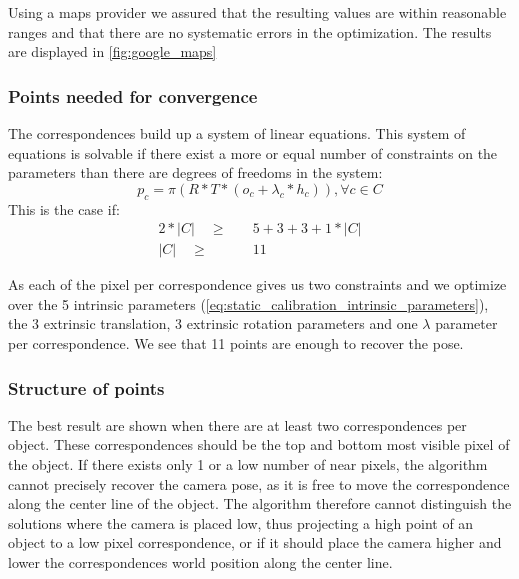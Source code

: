 Using a maps provider we assured that the resulting values are within reasonable ranges and that there are no systematic errors in the optimization.
The results are displayed in \autoref{fig:google_maps}

\subsubsection{Points needed for convergence}
The correspondences build up a system of linear equations. 
This system of equations is solvable if there exist a more or equal number of constraints on the parameters than there are degrees of freedoms in the system:
\begin{equation}
  \label{eq:static_calibration_reprojection_evaluation}
  p_c = \pi \left(  
    R * T *
    (o_c + \lambda_c * h_c)
  \right), \forall c \in C
\end{equation}
This is the case if:
\begin{equation}
  \begin{split}
  2 * \left\lvert C \right\rvert \quad \geq& \quad 5 + 3 + 3 + 1 * \left\lvert C \right\rvert \\
  \left\lvert C \right\rvert \quad \geq& \quad 11 
\end{split}
\end{equation} 

As each of the pixel per correspondence gives us two constraints and we optimize over the 5 intrinsic parameters (\autoref{eq:static_calibration_intrinsic_parameters}), the 3 extrinsic translation, 3 extrinsic rotation parameters and one $\lambda$ parameter per correspondence.
We see that 11 points are enough to recover the pose.

\subsubsection{Structure of points}
The best result are shown when there are at least two correspondences per object.
These correspondences should be the top and bottom most visible pixel of the object.
If there exists only 1 or a low number of near pixels, the algorithm cannot precisely recover the camera pose, as it is free to move the correspondence along the center line of the object.
The algorithm therefore cannot distinguish the solutions where the camera is placed low, thus projecting a high point of an object to a low pixel correspondence, 
or if it should place the camera higher and lower the correspondences world position along the center line.

